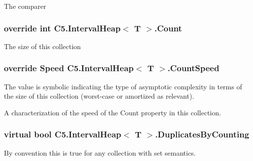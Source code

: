 The comparer\hypertarget{class_c5_1_1_interval_heap_a4db5c619c65ba918015da4cd45f7ba8d}{}
\subsubsection[{Count}]{\setlength{\rightskip}{0pt plus 5cm}override int {\bf C5.\+Interval\+Heap}$<$ T $>$.Count\hspace{0.3cm}{\ttfamily [get]}}\label{class_c5_1_1_interval_heap_a4db5c619c65ba918015da4cd45f7ba8d}




The size of this collection\hypertarget{class_c5_1_1_interval_heap_a33d630a81c86d10cf5cff931662f3808}{}
\subsubsection[{Count\+Speed}]{\setlength{\rightskip}{0pt plus 5cm}override {\bf Speed} {\bf C5.\+Interval\+Heap}$<$ T $>$.Count\+Speed\hspace{0.3cm}{\ttfamily [get]}}\label{class_c5_1_1_interval_heap_a33d630a81c86d10cf5cff931662f3808}


The value is symbolic indicating the type of asymptotic complexity in terms of the size of this collection (worst-\/case or amortized as relevant). 

A characterization of the speed of the {\ttfamily Count} property in this collection.\hypertarget{class_c5_1_1_interval_heap_a7e944979e8700149ef1605b5ff7019e9}{}
\subsubsection[{Duplicates\+By\+Counting}]{\setlength{\rightskip}{0pt plus 5cm}virtual bool {\bf C5.\+Interval\+Heap}$<$ T $>$.Duplicates\+By\+Counting\hspace{0.3cm}{\ttfamily [get]}}\label{class_c5_1_1_interval_heap_a7e944979e8700149ef1605b5ff7019e9}


By convention this is true for any collection with set semantics. 

